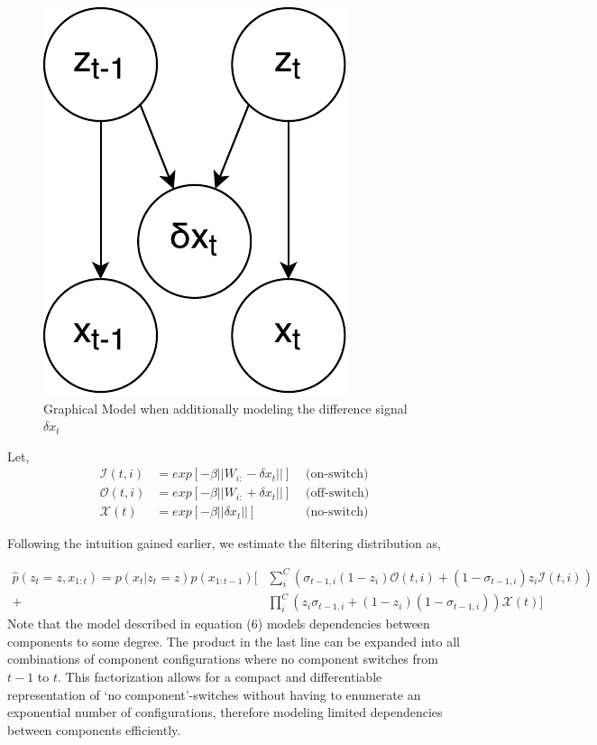\begin{figure}
\centering
\includegraphics[width=0.35\linewidth]{varbolt/gmod.pdf}
\caption[VarBOLT: Graphical Model when additionally modeling the difference signal.]{\label{graph_mod} Graphical Model when additionally modeling the difference signal $\delta x_t$}
\end{figure}
Let,
\begin{align*}
\mathcal{I}(t,i) &= exp[-\beta||W_{i:} - \delta x_t||] & \text{\ \ \ \ \ \ (on-switch)}\\
\mathcal{O}(t,i) &= exp[-\beta||W_{i:} + \delta x_t||]&\text{\ \ \ \ \ \ (off-switch)}\\
\mathcal{X}(t) &= exp[-\beta||\delta x_t||]& \text{\ \ \ \ \ \ (no-switch)}
\end{align*}

Following the intuition gained earlier, we estimate the filtering distribution as,

\begin{equation}
\begin{aligned}
\hat{p}(z_t = z, x_{1:t}) = p(x_t|z_t = z)p(x_{1:t-1})
[&\sum_i^C (\sigma_{t-1,i}(1-z_i)\mathcal{O}(t,i) + (1-\sigma_{t-1,i})z_i \mathcal{I}(t,i)) \\
+ &\prod_i^C(z_i\sigma_{t-1,i} + (1-z_i)(1-\sigma_{t-1,i})) \mathcal{X}(t)]
\end{aligned}
\end{equation}%
Note that the model described in equation (6) models dependencies between components to some degree. The product in the last line can be expanded into all combinations of component configurations where no component switches from $t-1$ to $t$. This factorization allows for a compact and differentiable representation of `no component'-switches without having to enumerate an exponential number of configurations, therefore modeling limited dependencies between components efficiently.

